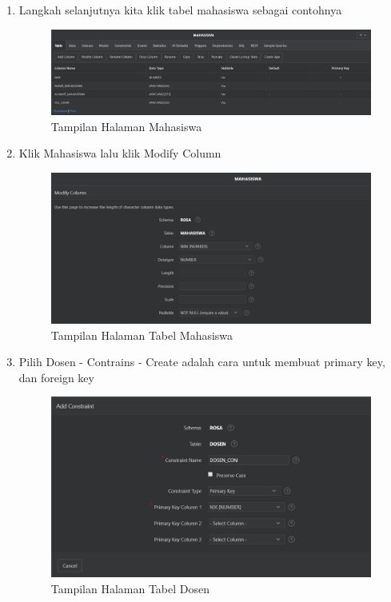 \begin{enumerate}
\item Langkah selanjutnya kita klik tabel mahasiswa sebagai contohnya
    \begin{figure}[!htbp]
    \begin{center}
    \includegraphics[scale=0.4]{section/ica58.JPG}
    \caption{Tampilan Halaman Mahasiswa}
    \end{center}   
    \end{figure} \vspace{5cm}

\item Klik Mahasiswa lalu klik  Modify Column
    \begin{figure}[!htbp]
    \begin{center}
    \includegraphics[scale=0.6]{section/ica60.JPG}
    \caption{Tampilan Halaman Tabel Mahasiswa}
    \end{center}   
    \end{figure} 
    
\item Pilih Dosen - Contrains - Create adalah cara untuk membuat primary key, dan foreign key 
    \begin{figure}[!htbp]
    \begin{center}
    \includegraphics[scale=0.7]{section/ica1.JPG}
    \caption{Tampilan Halaman Tabel Dosen}
    \end{center}   
    \end{figure} 


\end{enumerate}
